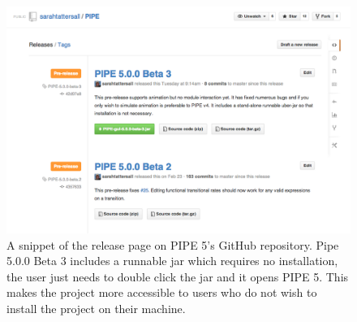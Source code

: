     \mediumlinespacing
\begin{figure}[tb]
\begin{center}
    \includegraphics[width=\linewidth]{build/gh_release.png} 
    \caption{A snippet of the release page on PIPE 5's GitHub repository. Pipe 5.0.0 Beta 3 includes a runnable jar which requires no installation, the user just needs to double click the jar and it opens PIPE 5. This makes the project more accessible to users who do not wish to install the project on their machine.}
    \label{fig:gh_release}
\end{center}
\end{figure}
\normallinespacing

